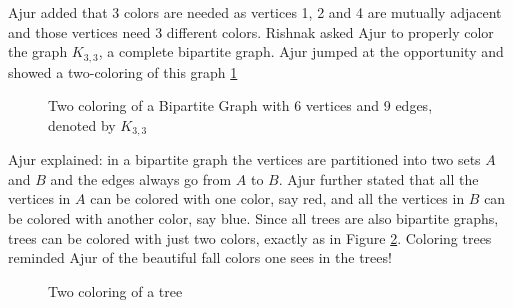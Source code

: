 Ajur added that 3 colors are needed as vertices 1, 2 and 4 are mutually adjacent and those vertices need 3 different colors. 
Rishnak asked Ajur to properly color the graph $K_{3,3}$, a complete bipartite graph. Ajur jumped at the opportunity and showed a two-coloring of this graph \ref{10g3}
\begin{figure}
\begin{center}
\caption{ Two coloring of a Bipartite Graph with 6 vertices and 9 edges, denoted by $K_{3,3}$}\label{10g3}
\end{center}
\end{figure}

Ajur explained: in a bipartite graph the vertices are partitioned into two sets $A$ and $B$ and the edges always go from $A$ to $B$. Ajur further stated that all the vertices in $A$ can be colored with one color, say red, and all the vertices in $B$ can be colored with another color, say blue. Since all trees are also bipartite graphs, trees can be colored with just two colors, exactly as in Figure \ref{10g4}. Coloring trees reminded Ajur of the beautiful fall colors one sees in the trees!
\begin{figure}
\begin{center}


\caption{Two coloring of a tree }\label{10g4}
\end{center}
\end{figure}

